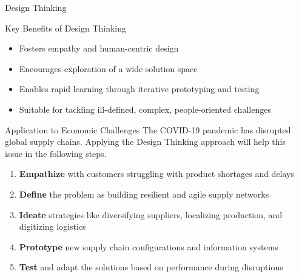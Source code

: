 \documentclass[final]{beamer}
\begin{document}
\begin{frame}{}
\begin{columns}[t]
\begin{column}{.3\linewidth}
\begin{block}{Design Thinking}
			\end{block}
			\vspace{1cm}
			\begin{block}{Key Benefits of Design Thinking}
				\begin{itemize}
					\item Fosters empathy and human-centric design
					\item Encourages exploration of a wide solution space
					\item Enables rapid learning through iterative prototyping and testing
					\item Suitable for tackling ill-defined, complex, people-oriented challenges
				\end{itemize}
			\end{block}
			\vspace{1cm}
			\begin{block}{Application to Economic Challenges}
				The COVID-19 pandemic has disrupted global supply chains. Applying the Design Thinking approach will help this issue in the following steps.
				\begin{enumerate}
					\item \textbf{Empathize} with customers struggling with product shortages and delays
					\item \textbf{Define} the problem as building resilient and agile supply networks
					\item \textbf{Ideate} strategies like diversifying suppliers, localizing production, and digitizing logistics
					\item \textbf{Prototype} new supply chain configurations and information systems
					\item \textbf{Test} and adapt the solutions based on performance during disruptions
				\end{enumerate}
			\end{block}

		\end{column}

		\begin{column}{.35\linewidth}
			\vspace{-0.82cm}
			\begin{block}{}
				\centering
				\Large \textbf{\inserttitle}\\

				\vspace{1cm}

				\normalsize \insertauthor\\


\end{block}
\end{column}
\end{columns}
\end{frame}
\end{document}
